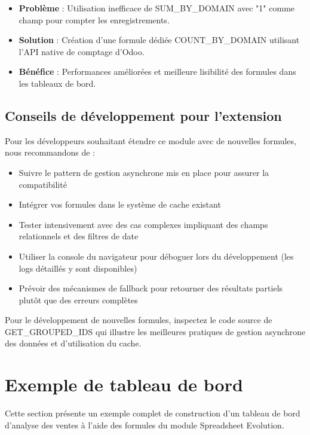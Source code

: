 \documentclass[12pt, a4paper]{article}
\begin{document}
\begin{itemize}
    \item \textbf{Problème} : Utilisation inefficace de SUM\_BY\_DOMAIN avec "1" comme champ pour compter les enregistrements.
    \item \textbf{Solution} : Création d'une formule dédiée COUNT\_BY\_DOMAIN utilisant l'API native de comptage d'Odoo.
    \item \textbf{Bénéfice} : Performances améliorées et meilleure lisibilité des formules dans les tableaux de bord.
\end{itemize}

\subsection{Conseils de développement pour l'extension}

Pour les développeurs souhaitant étendre ce module avec de nouvelles formules, nous recommandons de :

\begin{itemize}
    \item Suivre le pattern de gestion asynchrone mis en place pour assurer la compatibilité
    \item Intégrer vos formules dans le système de cache existant
    \item Tester intensivement avec des cas complexes impliquant des champs relationnels et des filtres de date
    \item Utiliser la console du navigateur pour déboguer lors du développement (les logs détaillés y sont disponibles)
    \item Prévoir des mécanismes de fallback pour retourner des résultats partiels plutôt que des erreurs complètes
\end{itemize}

\begin{tip}
Pour le développement de nouvelles formules, inspectez le code source de GET\_GROUPED\_IDS qui illustre les meilleures pratiques de gestion asynchrone des données et d'utilisation du cache.
\end{tip}

\section{Exemple de tableau de bord}

Cette section présente un exemple complet de construction d'un tableau de bord d'analyse des ventes à l'aide des formules du module Spreadsheet Evolution.
\end{document}
